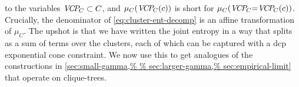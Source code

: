 \documentclass{article}
\begin{document}
to the variables $\mathit{V\mskip-5muC\mskip-3.5muP\!}_C \subset C$, and $\mu_C(\mathit{V\mskip-5muC\mskip-3.5muP\!}_C(c))$ is short for 
$\mu_C(\mathit{V\mskip-5muC\mskip-3.5muP\!}_C{=}\mathit{V\mskip-5muC\mskip-3.5muP\!}_C(c))$.
%
Crucially, the denominator of \eqref{eq:cluster-ent-decomp} is an affine transformation of $\mu_C$.
The upshot is that we have written the joint entropy in a way that
splits as a sum of terms over the clusters, each of which can be captured 
with
a dcp exponential cone constraint.
We now use this to get analogues of the constructions
in \cref{sec:small-gamma,%
sec:empirical-limit} that 
operate
on clique-trees.
\end{document}
